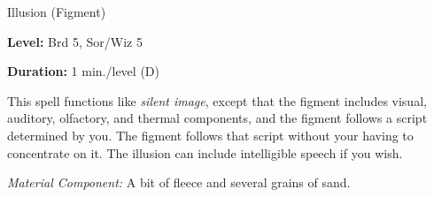 
Illusion (Figment)

\textbf{Level:} Brd 5, Sor/Wiz 5

\textbf{Duration:} 1 min./level (D)

This spell functions like \textit{silent image}, except that the figment includes 
visual, auditory, olfactory, and thermal components, and the figment follows a 
script determined by you. The figment follows that script without your having to 
concentrate on it. The illusion can include intelligible speech if you wish. 

\textit{Material Component:} A bit of fleece and several grains of sand.

